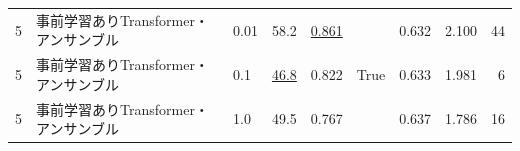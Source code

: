\documentclass[12pt]{jarticle}
\numberwithin{equation}{section}    %
\numberwithin{figure}{section}      %
\numberwithin{table}{section}      %
\begin{document}
\begin{table}[bt]
\begin{center}
{\begin{tabular}{|l|l|l|rrc|rrr|}
                5                        & 事前学習ありTransformer・アンサンブル & 0.01                                     & 58.2                         & \underline{0.861}         &                            & 0.632                         & 2.100                             & 44                         \\
                5                        & 事前学習ありTransformer・アンサンブル & 0.1                                      & \underline{46.8}             & 0.822                     & True                       & 0.633                         & 1.981                             & 6                          \\
                5                        & 事前学習ありTransformer・アンサンブル & 1.0                                      & 49.5                         & 0.767                     &                            & 0.637                         & 1.786                             & 16                         \\
                \hline
            \end{tabular}
        }
    \end{center}
\end{table}
\end{document}
